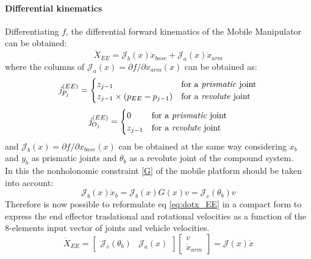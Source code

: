 \paragraph{Differential kinematics}Differentiating $f$, the differential forward kinematics of the Mobile Manipulator can be obtained:
\begin{equation}\label{eq:dotx_EE}
	\dot{X}_{EE}=\mathcal{J}_b(x)\dot{x}_{base}+\mathcal{J}_a(x)\dot{x}_{arm}
\end{equation}
where the columns of $\mathcal{J}_a(x)={\partial f}/{\partial x_{arm}}(x)$ can be obtained as:
\begin{equation}
\mathit{j}_{P_j}^{(EE)}=
	\begin{cases}
	z_{j-1} & \text{for a \textit{prismatic} joint} \\
	z_{j-1}\times \left(p_{EE}-p_{j-1}\right) & \text{for a \textit{revolute} joint}	
	\end{cases}                                             
\end{equation}
\begin{equation}
	\mathit{j}_{O_j}^{(EE)}= 
	\begin{cases}
	0 & \text{for a \textit{prismatic} joint} \\
	z_{j-1} & \text{for a \textit{revolute} joint}	
	\end{cases} 
\end{equation}
and $\mathcal{J}_b(x)={\partial f}/{\partial x_{base}}(x)$ can be obtained at the same way considering $x_b$ and $y_b$ as prismatic joints and $\theta_b$ as a revolute joint of the compound system.\\
In this the nonholonomic constraint \ref{G} of the mobile platform should be taken into account:
\begin{equation}
	\mathcal{J}_b(x)\dot{x}_b=\mathcal{J}_b(x)G(x)v=\mathcal{J}_v(\theta_b)v
\end{equation}
Therefore is now possible to reformulate eq \ref{eq:dotx_EE} in a compact form to express the end effector traslational and rotational velocities as a function of the 8-elements input vector of joints and vehicle velocities.
\begin{equation}
\dot{X}_{EE}=\left[\begin{matrix}
\mathcal{J}_v(\theta_b) & \mathcal{J}_a(x)
\end{matrix}\right]\left[\begin{matrix}v\\\dot{x}_{arm} \end{matrix}\right] = \mathcal{J}(x)\dot{x}
\end{equation}

